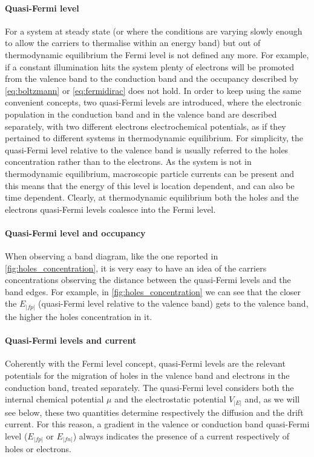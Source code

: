 		\paragraph{Quasi-Fermi level}
		For a system at steady state (or where the conditions are varying slowly enough to allow the carriers to thermalise within an energy band) but out of thermodynamic equilibrium the Fermi level is not defined any more.
		For example, if a constant illumination hits the system plenty of electrons will be promoted from the valence band to the conduction band and the occupancy described by \cref{eq:boltzmann} or \cref{eq:fermidirac} does not hold.
		In order to keep using the same convenient concepts, two quasi\hyp{}Fermi levels are introduced, where the electronic population in the conduction band and in the valence band are described separately, with two different electrons electrochemical potentials, as if they pertained to different systems in thermodynamic equilibrium.
		For simplicity, the quasi-Fermi level relative to the valence band is usually referred to the holes concentration rather than to the electrons.
		As the system is not in thermodynamic equilibrium, macroscopic particle currents can be present and this means that the energy of this level is location dependent, and can also be time dependent.
		Clearly, at thermodynamic equilibrium both the holes and the electrons quasi\hyp{}Fermi levels coalesce into the Fermi level.
		
		\paragraph{Quasi-Fermi level and occupancy}
		When observing a band diagram, like the one reported in \cref{fig:holes_concentration}, it is very easy to have an idea of the carriers concentrations observing the distance between the quasi\hyp{}Fermi levels and the band edges.
		For example, in \cref{fig:holes_concentration} we can see that the closer the $E_|fp|$ (quasi\hyp{}Fermi level relative to the valence band) gets to the valence band, the higher the holes concentration in it.
		
		\paragraph{Quasi\hyp{}Fermi levels and current}
		Coherently with the Fermi level concept, quasi-Fermi levels are the relevant potentials for the migration of holes in the valence band and electrons in the conduction band, treated separately.
		The quasi\hyp{}Fermi level considers both the internal chemical potential $\mu$ and the electrostatic potential $V_|E|$ and, as we will see below, these two quantities determine respectively the diffusion and the drift current.
		For this reason, a gradient in the valence or conduction band quasi\hyp{}Fermi level ($E_|fp|$ or $E_|fn|$) always indicates the presence of a current respectively of holes or electrons.
		

